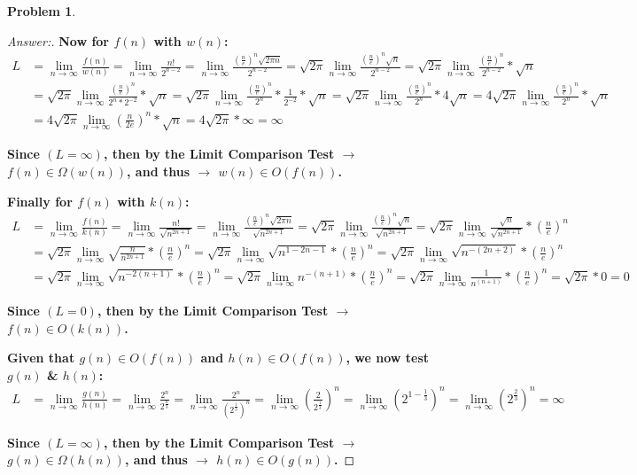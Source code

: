 \documentclass[11pt]{article}
\theoremstyle{definition}
\theoremstyle{definition}
\newtheorem{required}{Problem}
\theoremstyle{definition}
\begin{document}
\begin{required}
\begin{enumerate}[label=(\alph*)]
\begin{proof}[Answer:]
\item \textbf{Now for $f(n)$ with $w(n)$:}
\begin{align*}
L &= \lim_{n \to \infty} \frac{f(n)}{w(n)} = \lim_{n \to \infty} \frac{n!}{2^{n - 2}} = \lim_{n \to \infty} \frac{(\frac{n}{e})^n \sqrt{2 \pi n}}{2^{n - 2}} = \sqrt{2 \pi} \lim_{n \to \infty} \frac{(\frac{n}{e})^n \sqrt n}{2^{n - 2}} = \sqrt{2 \pi} \lim_{n \to \infty} \frac{(\frac{n}{e})^n}{2^{n - 2}} * \sqrt n \\
&= \sqrt{2 \pi} \lim_{n \to \infty} \frac{(\frac{n}{e})^n}{2^n * 2^{-2}} * \sqrt n = \sqrt{2 \pi} \lim_{n \to \infty} \frac{(\frac{n}{e})^n}{2^n} *  \frac{1}{2^{-2}} * \sqrt n = \sqrt{2 \pi} \lim_{n \to \infty} \frac{(\frac{n}{e})^n}{2^n} * 4 \sqrt n = 4 \sqrt{2 \pi} \lim_{n \to \infty} \frac{(\frac{n}{e})^n}{2^n} * \sqrt n \\
&= 4 \sqrt{2 \pi} \lim_{n \to \infty} (\frac{n}{2e})^n * \sqrt n = 4 \sqrt{2 \pi} * \infty = \infty
\end{align*}
\item \textbf{Since $(L = \infty)$, then by the Limit Comparison Test $\to$ $f(n) \in \Omega(w(n))$, and thus $\to$ $w(n) \in O(f(n))$.}

\item \textbf{Finally for $f(n)$ with $k(n)$:}
\begin{align*}
L &= \lim_{n \to \infty} \frac{f(n)}{k(n)} = \lim_{n \to \infty} \frac{n!}{\sqrt{n^{2n+1}}} = \lim_{n \to \infty} \frac{(\frac{n}{e})^n \sqrt{2 \pi n}}{\sqrt{n^{2n+1}}} = \sqrt{2 \pi} \lim_{n \to \infty} \frac{(\frac{n}{e})^n \sqrt n}{\sqrt{n^{2n+1}}} = \sqrt{2 \pi} \lim_{n \to \infty} \frac{\sqrt n}{\sqrt{n^{2n+1}}} * (\frac{n}{e})^n \\
&= \sqrt{2 \pi} \lim_{n \to \infty} \sqrt{\frac{n}{n^{2n+1}}} * (\frac{n}{e})^n = \sqrt{2 \pi} \lim_{n \to \infty} \sqrt{n^{1 - 2n - 1}} * (\frac{n}{e})^n = \sqrt{2 \pi} \lim_{n \to \infty} \sqrt{n^{-(2n + 2)}} * (\frac{n}{e})^n \\
&= \sqrt{2 \pi} \lim_{n \to \infty} \sqrt{n^{-2(n + 1)}} * (\frac{n}{e})^n = \sqrt{2 \pi} \lim_{n \to \infty} n^{-(n + 1)} * (\frac{n}{e})^n = \sqrt{2 \pi} \lim_{n \to \infty} \frac{1}{n^{(n + 1)}} * (\frac{n}{e})^n = \sqrt{2 \pi} * 0 = 0
\end{align*}
\item \textbf{Since $(L = 0)$, then by the Limit Comparison Test $\to$ $f(n) \in O(k(n))$.}

\item \textbf{Given that $g(n) \in O(f(n))$ and $h(n) \in O(f(n))$, we now test $g(n)$ \& $h(n)$:}
\begin{align*}
L &= \lim_{n \to \infty} \frac{g(n)}{h(n)} = \lim_{n \to \infty} \frac{2^n}{2^{\frac{n}{3}}} = \lim_{n \to \infty} \frac{2^n}{(2^{\frac{1}{3}})^n} = \lim_{n \to \infty} (\frac{2}{2^{\frac{1}{3}}})^n = \lim_{n \to \infty} (2^{1 - \frac{1}{3}})^n = \lim_{n \to \infty} (2^{\frac{2}{3}})^n = \infty
\end{align*}
\item \textbf{Since $(L = \infty)$, then by the Limit Comparison Test $\to$ $g(n) \in \Omega(h(n))$, and thus $\to$ $h(n) \in O(g(n))$.}


\end{proof}
\end{enumerate}
\end{required}
\end{document}
